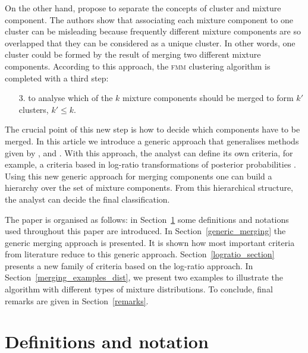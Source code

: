 \documentclass[submit]{smj}
\theoremstyle{definition}
\newcommand{\fmm}{\textsc{fmm}\xspace}
\begin{document}
On the other hand, \cite{lee2004combining,hennig2010methods,baudry2010combining,melnykov2013distribution,pastore2013merging} propose to separate the concepts of cluster and mixture component. The authors show that associating each mixture component to one cluster can be misleading because frequently different mixture components are so overlapped that they can be considered as a unique cluster. In other words, one cluster could be formed by the result of merging two different mixture components. According to this approach, the \fmm clustering algorithm is completed with a third step:

\begin{itemize}
\item[3.] to analyse which of the $k$ mixture components should be merged to form $k'$ clusters, $k' \leq k$.
\end{itemize}

The crucial point of this new step is how to decide which components have to be merged. In this article we introduce a generic approach that generalises methods given by \cite{baudry2010combining}, \cite{hennig2010methods} and \cite{longford2014}. With this approach, the analyst can define its own criteria, for example, a criteria based in log-ratio transformations of posterior probabilities \citep{aitchison1986statistical}. Using this new generic approach for merging components one can build a hierarchy over the set of mixture components. From this hierarchical structure, the analyst can decide the final classification.

The paper is organised as follows: in Section~\ref{definitions} some definitions and notations used throughout this paper are introduced. In Section~\ref{generic_merging} the generic merging approach is presented. It is shown how most important criteria from literature reduce to this generic approach. Section~\ref{logratio_section} presents a new family of criteria based on the log-ratio approach. In Section~\ref{merging_examples_dist}, we present two examples to illustrate the algorithm with different types of mixture distributions. To conclude, final remarks are given in Section~\ref{remarks}.

\section{Definitions and notation}\label{definitions}
\end{document}

